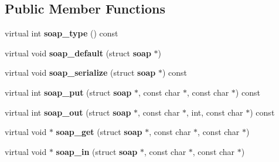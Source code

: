 \subsection*{Public Member Functions}
\begin{DoxyCompactItemize}
\item 
virtual int {\bfseries soap\_\-type} () const \label{classtransfer____TransferJobSummary2_a49fed8a5c2e528f712e6c79263827170}

\item 
virtual void {\bfseries soap\_\-default} (struct {\bf soap} $\ast$)\label{classtransfer____TransferJobSummary2_a72cd54a087b7b88cf29268d37cc4351a}

\item 
virtual void {\bfseries soap\_\-serialize} (struct {\bf soap} $\ast$) const \label{classtransfer____TransferJobSummary2_a16d105f097e289f0a2ffad0013f55e85}

\item 
virtual int {\bfseries soap\_\-put} (struct {\bf soap} $\ast$, const char $\ast$, const char $\ast$) const \label{classtransfer____TransferJobSummary2_a52cc4a67bae2c23aeba245c5f62053a4}

\item 
virtual int {\bfseries soap\_\-out} (struct {\bf soap} $\ast$, const char $\ast$, int, const char $\ast$) const \label{classtransfer____TransferJobSummary2_a03e68b7ccd108bebaeded8fd75fc46df}

\item 
virtual void $\ast$ {\bfseries soap\_\-get} (struct {\bf soap} $\ast$, const char $\ast$, const char $\ast$)\label{classtransfer____TransferJobSummary2_af5072c98bbd3ebe782aa21efc89aff04}

\item 
virtual void $\ast$ {\bfseries soap\_\-in} (struct {\bf soap} $\ast$, const char $\ast$, const char $\ast$)\label{classtransfer____TransferJobSummary2_a206be7a9d90b967f7b9e2b42419fdf9b}

\end{DoxyCompactItemize}

